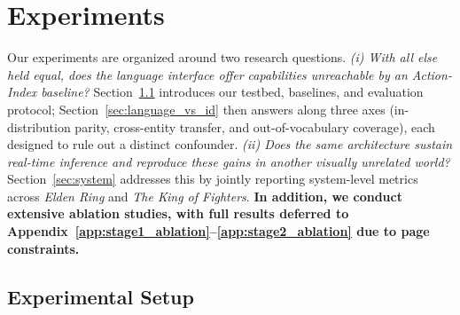 
\section{Experiments}
\label{sec:experiments}

Our experiments are organized around two research questions.
\emph{(i) With all else held equal, does the language interface 
offer capabilities unreachable by an Action-Index baseline?}
Section~\ref{sec:setup} introduces our testbed, baselines, 
and evaluation protocol; 
Section~\ref{sec:language_vs_id} then answers along three 
axes (in-distribution parity, cross-entity transfer, 
and out-of-vocabulary coverage), each designed to rule out a 
distinct confounder.
\emph{(ii) Does the same architecture sustain real-time 
inference and reproduce these gains in another 
visually unrelated world?}
Section~\ref{sec:system} addresses 
this by jointly reporting system-level metrics across 
\textit{Elden Ring} and \textit{The King of Fighters}.
\textbf{In addition, we conduct extensive ablation studies, with full results deferred to 
Appendix~\ref{app:stage1_ablation}--\ref{app:stage2_ablation} due to page constraints.}

\subsection{Experimental Setup}
\label{sec:setup}


